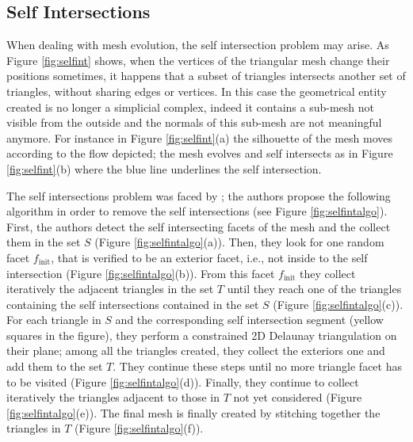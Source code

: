 \subsection{Self Intersections}
When dealing with mesh evolution, the self intersection problem may arise. 
As Figure \ref{fig:selfint} shows, when the vertices of the triangular mesh change their positions sometimes, it happens  that a subset of triangles intersects another set of triangles, without sharing edges or vertices. 
In this case the geometrical entity created is no longer a simplicial complex, indeed it contains a sub-mesh not visible from the outside and the normals of this sub-mesh are not meaningful anymore.
For instance in Figure \ref{fig:selfint}(a) the silhouette of the mesh moves according to the flow depicted;  the mesh evolves and self intersects  as in Figure \ref{fig:selfint}(b)  where the blue line underlines the self intersection.

The self intersections problem was faced by \cite{zaharescu2007transformesh}; the authors propose the following algorithm in order to remove the self intersections (see Figure \ref{fig:selfintalgo}).
First, the authors detect the self intersecting facets of the mesh and the collect them in the  set  $\mathit{S}$ (Figure \ref{fig:selfintalgo}(a)).
Then, they look for one random facet $f_{\text{init}}$, that is verified to be an exterior facet, i.e., not inside to the self intersection (Figure \ref{fig:selfintalgo}(b)).
From this facet $f_{\text{init}}$ they collect iteratively the adjacent triangles in the set  $\mathit{T}$ until they reach one of the triangles containing the self intersections contained in the set $\mathit{S}$ (Figure \ref{fig:selfintalgo}(c)).  
For each triangle in $\mathit{S}$ and the corresponding self intersection segment (yellow squares in the figure), they perform a constrained 2D Delaunay triangulation on their plane; among all the triangles created, they collect the exteriors one and add them to the set $\mathit{T}$.
They continue these steps until no more triangle facet has to be visited (Figure \ref{fig:selfintalgo}(d)).
Finally,  they continue to collect iteratively the triangles adjacent to those in $\mathit{T}$ not yet considered (Figure \ref{fig:selfintalgo}(e)). 
The final mesh is finally created by stitching together the triangles in $\mathit{T}$ (Figure \ref{fig:selfintalgo}(f)).

